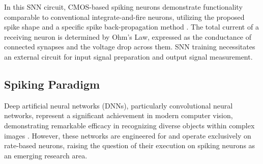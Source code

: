 \noindent In this SNN circuit, CMOS-based spiking neurons demonstrate functionality comparable to conventional integrate-and-fire neurons, utilizing the proposed spike shape and a specific spike back-propagation method \cite{prezioso2016self}. The total current of a receiving neuron is determined by Ohm's Law, expressed as the conductance of connected synapses and the voltage drop across them. SNN training necessitates an external circuit for input signal preparation and output signal measurement.

\subsection[Spiking Paradigm]{Spiking Paradigm}


Deep artificial neural networks (DNNs), particularly convolutional neural networks, represent a significant achievement in modern computer vision, demonstrating remarkable efficacy in recognizing diverse objects within complex images \cite{krizhevsky2012imagenet}. However, these networks are engineered for and operate exclusively on rate-based neurons, raising the question of their execution on spiking neurons as an emerging research area.\\


